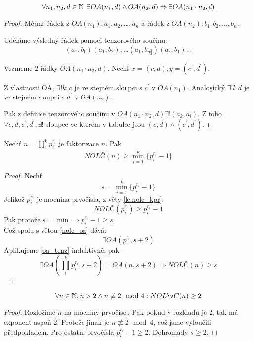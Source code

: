 \begin{theorem}\label{oa_tenz}
	\[ \forall n_1,n_2,d \in \operatorname{\mathbb{N}} \ \exists OA(n_1, d) \land OA(n_2, d) \Rightarrow \exists OA(n_1 \cdot n_2, d) \]
\end{theorem}
\begin{proof}
	Mějme řádek z $OA(n_1): a_1, a_2, ..., a_n$ a řádek z $OA(n_2): b_1, b_2, ..., b_n$.

	Uděláme výsledný řádek pomoci tenzorového součinu:
	\[ (a_1, b_1) (a_1, b_2), ...(a_1, b_{n_2^2})(a_2, b_1) ... \]

	Vezmeme 2 řádky $OA(n_1 \cdot n_2, d)$.
	Nechť $x = (c, d), y = (c^{\prime}, d^{\prime})$.

	Z vlastnosti OA, $\exists! k: c$ je ve stejném sloupci s $c^{\prime}$ v $OA(n_1)$.
	Analogický $\exists! l: d$ je ve stejném sloupci s $d^{\prime}$ v $OA(n_2)$.

	Pak z definice tenzorového součinu v $OA(n_1 \cdot n_2, d) \exists ! (a_k, a_l)$.
	Z toho
	$ \forall c, d, c^{\prime}, d^{\prime}, \exists !$ sloupec ve kterém v tabulce jsou $(c, d) \land (c^{\prime}, d^{\prime})$.
\end{proof}

\begin{theorem}\label{nolc_lower_0}
	Nechť $n = \prod_1^k p_i^{r_i}$ je faktorizace $n$. Pak
	\[ NOLČ(n) \geq \min_{i = 1}^k \{ p_i^{r_i} - 1 \}  \]
\end{theorem}
\begin{proof}
	Nechť \[ s = \min_{i = 1}^k \{ p_i^{r_i} - 1 \} \]
	Jelikož $p_i^{r_i}$ je mocnina prvočísla, z věty \cref{lc:nolc_kpr}:
	\[ NOLČ(p_i^{r_i}) \geq p_i^{r_i} - 1 \]
	Pak protože $s = \min \Rightarrow p_i^{r_i} - 1 \geq s$.\\
	Což spolu s větou \cref{nolc_oa} dává:
	\[ \exists OA(p_i^{r_i}, s + 2) \]
	Aplikujeme \cref{oa_tenz} induktivně, pak
	\[ \exists OA(\prod_1^k p_i^{r_i}, s + 2) = OA(n, s + 2) \Rightarrow NOLČ(n) \geq s \]
\end{proof}

\begin{consequence}\label{nolc_lower_1}
	\[ \forall n \in \N, n > 2 \land n \not\equiv 2 \mod 4: NOLČ(n) \geq 2 \]
\end{consequence}
\begin{proof}
	Rozložíme $n$ na mocniny prvočísel. Pak pokud v rozkladu je 2, tak má exponent aspoň 2.
	Protože jinak je $n \not\equiv 2 \mod 4$, což jsme vyloučili předpokladem.
	Pro ostatní prvočísla $p_i^{r_i} - 1 \geq 2$.
	Dohromady $s \geq 2$.
\end{proof}

